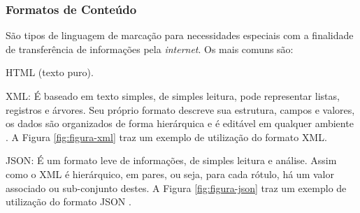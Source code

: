     	\subsubsection{Formatos de Conteúdo}
    	\label{sec:formatos-de-conteudo}
    	São tipos de linguagem de marcação para necessidades especiais com a finalidade de transferência de informações pela \textit{internet}. Os mais comuns são:
    	
        \begin{alineascomponto}
        	\item \gls{HTML} (texto puro).
            \item \gls{XML}:  É baseado em texto simples, de simples leitura, pode representar listas, registros e árvores. Seu próprio formato descreve sua estrutura, campos e valores, os dados são organizados de forma hierárquica e é editável em qualquer ambiente \cite{XML}. A Figura \ref{fig:figura-xml} traz um exemplo de utilização do formato \gls{XML}.
                \begin{figure}[!h]
        	    \end{figure}
            \item \gls{JSON}: É um formato leve de informações, de simples leitura e análise. Assim como o \gls{XML} é hierárquico, em pares, ou seja, para cada rótulo, há um valor associado ou sub-conjunto destes. A Figura \ref{fig:figura-json} traz um exemplo de utilização do formato \gls{JSON} \cite{JSON}.
                \begin{figure}[!h]

\end{figure}
\end{alineascomponto}
